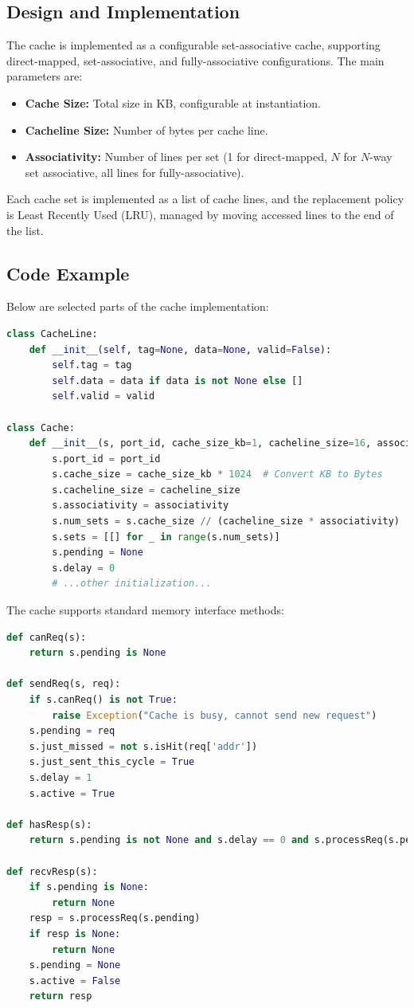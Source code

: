 \documentclass[12pt,a4paper]{report}
\begin{document}
\subsection{Design and Implementation}
The cache is implemented as a configurable set-associative cache, supporting direct-mapped, set-associative, and fully-associative configurations. The main parameters are:
\begin{itemize}
  \item \textbf{Cache Size:} Total size in KB, configurable at instantiation.
  \item \textbf{Cacheline Size:} Number of bytes per cache line.
  \item \textbf{Associativity:} Number of lines per set (1 for direct-mapped, $N$ for $N$-way set associative, all lines for fully-associative).
\end{itemize}
Each cache set is implemented as a list of cache lines, and the replacement policy is Least Recently Used (LRU)\cite{gfg_lru_cache}, managed by moving accessed lines to the end of the list.

\subsection{Code Example}
Below are selected parts of the cache implementation:

\begin{lstlisting}[language=Python]
class CacheLine:
    def __init__(self, tag=None, data=None, valid=False):
        self.tag = tag
        self.data = data if data is not None else []
        self.valid = valid

class Cache:
    def __init__(s, port_id, cache_size_kb=1, cacheline_size=16, associativity=1):
        s.port_id = port_id
        s.cache_size = cache_size_kb * 1024  # Convert KB to Bytes
        s.cacheline_size = cacheline_size
        s.associativity = associativity
        s.num_sets = s.cache_size // (cacheline_size * associativity)
        s.sets = [[] for _ in range(s.num_sets)]
        s.pending = None
        s.delay = 0
        # ...other initialization...
\end{lstlisting}

The cache supports standard memory interface methods:

\begin{lstlisting}[language=Python]
def canReq(s):
    return s.pending is None

def sendReq(s, req):
    if s.canReq() is not True:
        raise Exception("Cache is busy, cannot send new request")
    s.pending = req
    s.just_missed = not s.isHit(req['addr'])
    s.just_sent_this_cycle = True
    s.delay = 1
    s.active = True

def hasResp(s):
    return s.pending is not None and s.delay == 0 and s.processReq(s.pending) is not None

def recvResp(s):
    if s.pending is None:
        return None
    resp = s.processReq(s.pending)
    if resp is None:
        return None
    s.pending = None
    s.active = False
    return resp
\end{lstlisting}
\end{document}
